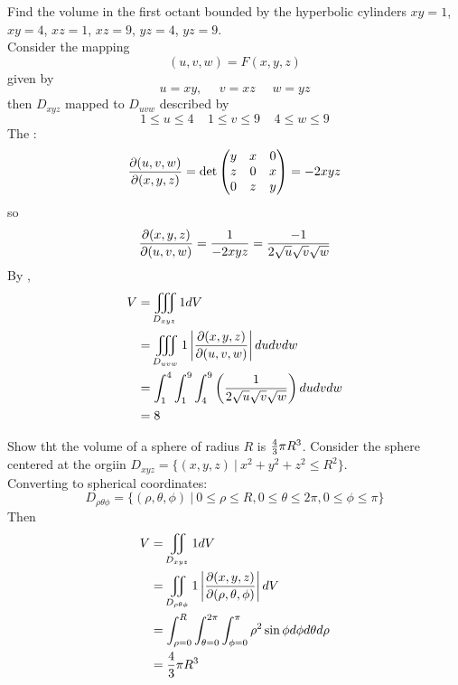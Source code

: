 \documentclass[english, 11pt]{article}
\begin{document}
\begin{exmp}
  Find the volume in the first octant bounded by the hyperbolic cylinders $xy = 1$, $xy = 4$, $xz = 1$, $xz = 9$, $yz = 4$, $yz = 9$. \\

  Consider the mapping
  \[ (u,v,w) = F(x,y,z) \]
  given by
  \[ u = xy, \ \ \ \ \ \ v = xz \ \ \ \ \ \ w = yz \]
  then $D_{xyz}$ mapped to $D_{uvw}$ described by
  \[ 1 \leq u \leq 4 \ \ \ \ \ 1 \leq v \leq 9 \ \ \ \ \ 4 \leq w \leq 9 \]
  The :
  \[ \frac{\partial(u,v,w)}{\partial(x,y,z)} = \det \left( \begin{matrix} y & x & 0 \\ z & 0 & x \\ 0 & z & y \end{matrix} \right) = -2xyz \]
  so
  \[ \frac{\partial(x,y,z)}{\partial(u,v,w)} = \frac{1}{-2xyz} = \frac{-1}{2\sqrt{u}\sqrt{v}\sqrt{w}} \]
  By ,
  \begin{align*}
    V & = \iiint\displaylimits_{D_{xyz}} 1 dV \\
      & = \iiint\displaylimits_{D_{uvw}} 1 \left| \frac{\partial(x,y,z)}{\partial(u,v,w)} \right|  dudvdw \\
      & = \int_1^4 \int_1^9 \int_4^9 \left( \frac{1}{2\sqrt{u}\sqrt{v}\sqrt{w}} \right) dudvdw \\
      & = 8
  \end{align*}
\end{exmp}

\begin{exmp}
  Show tht the volume of a sphere of radius $R$ is $\frac{4}{3} \pi R^3$. Consider the sphere centered at the orgiin $D_{xyz} = \{(x,y,z) \ | \ x^2 + y^2  + z^2 \leq R^2\}$. \\

  Converting to spherical coordinates:
  \[ D_{\rho \theta \phi} = \{(\rho, \theta, \phi) \ | \ 0 \leq \rho \leq R, 0 \leq \theta \leq 2\pi, 0 \leq \phi \leq \pi \} \]
  Then
  \begin{align*}
    V & = \iint\displaylimits_{D_{xyz}} 1 dV \\
      & = \iint\displaylimits_{D_{\rho \theta \phi}} 1 \left| \frac{\partial(x,y,z)}{\partial(\rho, \theta, \phi)}  \right| dV \\
      & = \int_{\rho = 0}^R \int_{\theta =0}^{2\pi} \int_{\phi = 0}^{\pi} \rho^2 \sin \phi d\phi d\theta d\rho \\
      & = \frac{4}{3} \pi R^3
  \end{align*}
\end{exmp}
\end{document}
